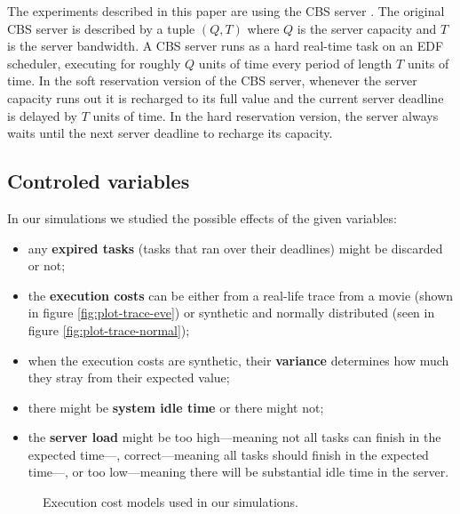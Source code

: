 \documentclass[times, 10pt,twocolumn]{article}
\begin{document}
The experiments described in this paper are using the CBS server
\cite{abeni.ea98:integrating}. The original CBS server is described by
a tuple $(Q,T)$ where $Q$ is the server capacity and $T$ is the server
bandwidth. A CBS server runs as a hard real-time task on an EDF
scheduler, executing for roughly $Q$ units of time every period of
length $T$ units of time. In the soft reservation version of the CBS
server, whenever the server capacity runs out it is recharged to its
full value and the current server deadline is delayed by $T$ units of
time. In the hard reservation version, the server always waits until
the next server deadline to recharge its capacity.

\subsection{Controled variables}
\label{sec:controled-variables}

In our simulations we studied the possible effects of the given
variables:
\begin{itemize}
\item any \textbf{expired tasks} (tasks that ran over their deadlines)
  might be discarded or not;
\item the \textbf{execution costs} can be either from a real-life
  trace from a movie (shown in figure \ref{fig:plot-trace-eve}) or
  synthetic and normally distributed (seen in figure
  \ref{fig:plot-trace-normal});
\item when the execution costs are synthetic, their \textbf{variance}
  determines how much they stray from their expected value;
\item there might be \textbf{system idle time} or there might not;
\item the \textbf{server load} might be too high---meaning not all
  tasks can finish in the expected time---, correct---meaning all
  tasks should finish in the expected time---, or too low---meaning
  there will be substantial idle time in the server.
\end{itemize}

\begin{figure*}[t]
  \centering
  \caption{Execution cost models used in our simulations.}
\end{figure*}
\end{document}
